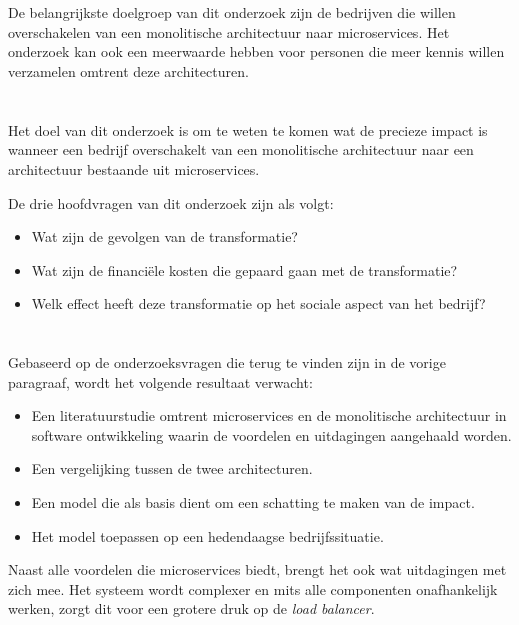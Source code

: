 \section{}
\label{sec:probleemstelling}

De belangrijkste doelgroep van dit onderzoek zijn de bedrijven die willen overschakelen van een monolitische architectuur naar microservices. Het onderzoek kan ook een meerwaarde hebben voor personen die meer kennis willen verzamelen omtrent deze architecturen. 

\section{}
\label{sec:onderzoeksvraag}

Het doel van dit onderzoek is om te weten te komen wat de precieze impact is wanneer een bedrijf overschakelt van een monolitische architectuur naar een architectuur bestaande uit microservices.

De drie hoofdvragen van dit onderzoek zijn als volgt:
\begin{itemize}
    \item Wat zijn de gevolgen van de transformatie?
    \item Wat zijn de financiële kosten die gepaard gaan met de transformatie?
    \item Welk effect heeft deze transformatie op het sociale aspect van het bedrijf?
\end{itemize}

\section{}
\label{sec:onderzoeksdoelstelling}

Gebaseerd op de onderzoeksvragen die terug te vinden zijn in de vorige paragraaf, wordt het volgende resultaat verwacht:

\begin{itemize}
    \item Een literatuurstudie omtrent microservices en de monolitische architectuur in software ontwikkeling waarin de voordelen en uitdagingen aangehaald worden.
    \item Een vergelijking tussen de twee architecturen. 
    \item Een model die als basis dient om een schatting te maken van de impact.
    \item Het model toepassen op een hedendaagse bedrijfssituatie.
\end{itemize}
Naast alle voordelen die microservices biedt, brengt het ook wat uitdagingen met zich mee. Het systeem wordt complexer en mits alle componenten onafhankelijk werken, zorgt dit voor een grotere druk op de \emph{load balancer}.

